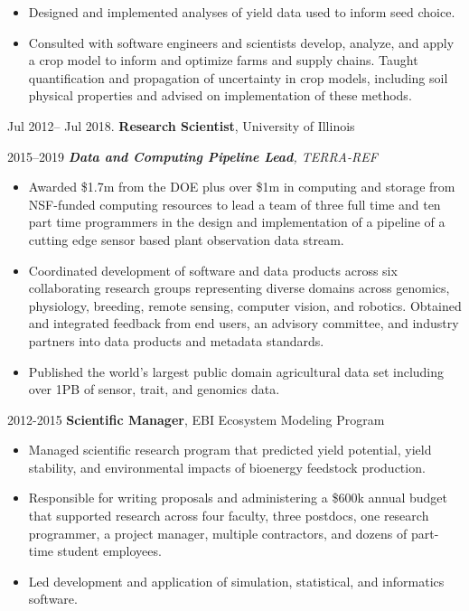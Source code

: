 \documentclass[a4paper,10pt]{article}
\begin{document}
\begin{itemize}
\item Designed and implemented analyses of yield data used to inform seed choice.
\item Consulted with software engineers and scientists  develop, analyze, and apply a crop model to inform and optimize farms and supply chains. Taught quantification and propagation of uncertainty in crop models, including soil physical properties and advised on implementation of these methods.
\end{itemize}

Jul 2012-- Jul 2018. \textbf{Research Scientist}, University of Illinois

\phantom{xxx}2015--2019 \emph{\textbf{Data and Computing Pipeline Lead}, TERRA-REF}
\begin{itemize}
\item Awarded \$1.7m from the DOE plus over \$1m in computing and storage from NSF-funded computing resources to lead a team of three full time and ten part time programmers in the design and implementation of a pipeline of a cutting edge sensor based plant observation data stream.
\item Coordinated development of software and data products across six collaborating research groups representing diverse domains across genomics, physiology, breeding, remote sensing, computer vision, and robotics. Obtained and integrated feedback from end users, an advisory committee, and industry partners into data products and metadata standards.
\item Published the world’s largest public domain agricultural data set including over 1PB of sensor, trait, and genomics data.
\end{itemize}

\phantom{xxx}2012-2015 \textbf{Scientific Manager}, EBI Ecosystem Modeling Program
\begin{itemize}
\item Managed scientific research program that predicted yield potential, yield stability, and environmental impacts of bioenergy feedstock production.
\item Responsible for writing proposals and administering a \$600k annual budget that supported research across four faculty, three postdocs, one research programmer, a project manager, multiple contractors, and dozens of part-time student employees.
\item Led development and application of simulation, statistical, and informatics software.
\end{itemize}
\end{document}
